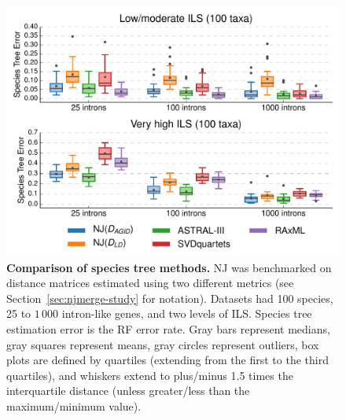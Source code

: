 \begin{figure}[!h]
\centering
\includegraphics[width=\textwidth]{figures/njmerge-fig7.pdf}
\caption{
{\bf Comparison of species tree methods. }
NJ was benchmarked on distance matrices estimated using two different metrics (see Section~\ref{sec:njmerge-study} for notation).
Datasets had 100 species, 25 to $1\,000$ intron-like genes, and two levels of ILS.
Species tree estimation error is the RF error rate.
Gray bars represent medians, gray squares represent means, gray circles represent outliers, box plots are defined by quartiles (extending from the first to the third quartiles), and whiskers extend to plus/minus 1.5 times the interquartile distance (unless greater/less than the maximum/minimum value).
}
\label{fig:compare-100-intron}
\end{figure}

